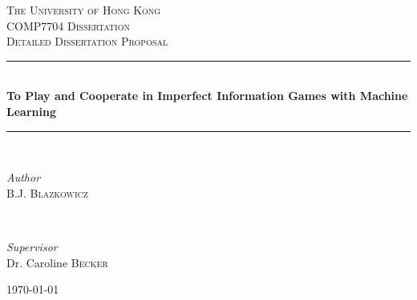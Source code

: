 \documentclass[11pt]{article}
\begin{document}
\begin{titlepage}

	\newcommand{\HRule}{\rule{\linewidth}{0.5mm}}
	\renewcommand{\baselinestretch}{1.2}
	
	\center
	
	\textsc{\LARGE The University of Hong Kong}\\[1.5cm]
	
	\textsc{\Large COMP7704 Dissertation}\\[0.5cm]
	
	\textsc{\large Detailed Dissertation Proposal}\\[0.5cm]
	
	\HRule\\[0.4cm]
	
	{\huge\bfseries To Play and Cooperate in Imperfect Information Games with Machine Learning}\\[0.4cm] %
	
	\HRule\\[1.5cm]
	
	
	\begin{minipage}{0.4\textwidth}
		\begin{flushleft}
			\large
			\textit{Author}\\
			B.J. \textsc{Blazkowicz} %
		\end{flushleft}
	\end{minipage}
	~
	\begin{minipage}{0.4\textwidth}
		\begin{flushright}
			\large
			\textit{Supervisor}\\
			Dr. Caroline \textsc{Becker} %
		\end{flushright}
	\end{minipage}
	
	
	
	\vfill\vfill\vfill %
	
	{\large\today} %
	
	
	 
	
	\vfill %
	
\end{titlepage}

\end{document}
